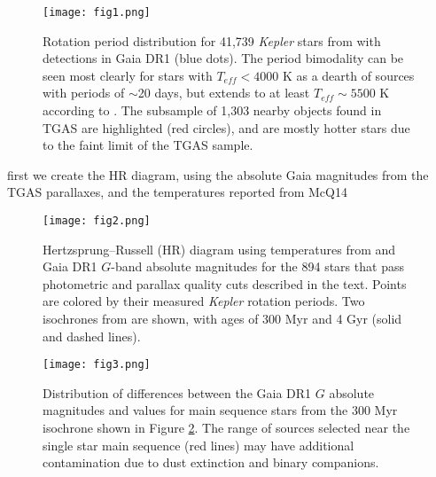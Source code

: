 \documentclass[manuscript, letterpaper]{aastex6}
\makeatletter
\let\origsection\section
\renewcommand\section{\@ifstar{\starsection}{\nostarsection}}
\newcommand\nostarsection[1]{\sectionprelude\origsection{#1}}
\newcommand\starsection[1]{\sectionprelude\origsection*{#1}}
\newcommand\sectionprelude{\vspace{1em}}
\newcommand{\Kepler}{\textsl{Kepler}\xspace}
\makeatother
\begin{document}

\begin{figure}[]
\centering
\texttt{[image: fig1.png]}
\caption{
Rotation period distribution for 41,739 \Kepler stars from \citet{mcquillan2014} with detections in Gaia DR1 (blue dots). The period bimodality can be seen most clearly for stars with $T_{eff} < 4000$ K as a dearth of sources with periods of $\sim$20 days, but extends to at least $T_{eff}\sim5500$ K according to \citet{mcquillan2014}. The subsample of 1,303 nearby objects found in TGAS are highlighted (red circles), and are mostly hotter stars due to the faint limit of the TGAS sample. 
}
\label{fig:all}
\end{figure}






\section{Selecting Main Sequence Stars}

              
              
first we create the HR diagram, using the absolute Gaia magnitudes from the TGAS parallaxes, and the temperatures reported from McQ14


\begin{figure}[]
\centering
\texttt{[image: fig2.png]}
\caption{Hertzsprung--Russell (HR) diagram using temperatures from \citet{mcquillan2014} and Gaia DR1 $G$-band absolute magnitudes for the 894 stars that pass photometric and parallax quality cuts described in the text. Points are colored by their measured \Kepler rotation periods. Two isochrones from \citet{bressan2012} are shown, with ages of 300 Myr and 4 Gyr (solid and dashed lines).
}
\label{fig:HR}
\end{figure}






\begin{figure}[]
\centering
\texttt{[image: fig3.png]}
\caption{Distribution of differences between the Gaia DR1 $G$ absolute magnitudes and values for main sequence stars from the 300 Myr isochrone shown in Figure \ref{fig:HR}. The range of sources selected near the single star main sequence (red lines) may have additional contamination due to dust extinction and binary companions.}
\label{fig:hist}
\end{figure}
\end{document}
